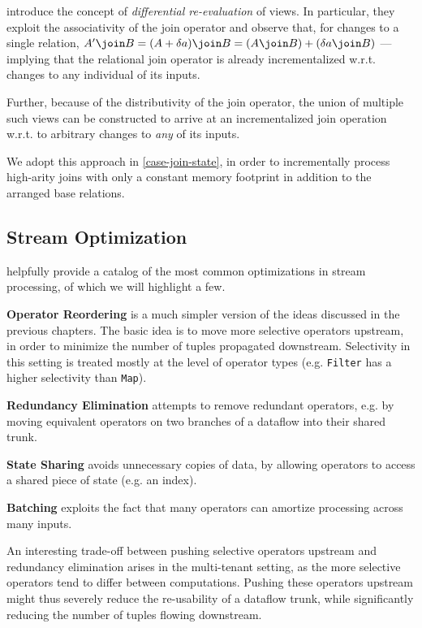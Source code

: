 \documentclass[../index.tex]{subfiles}
\begin{document}
\cite{blakeley1986efficiently} introduce the concept of
\emph{differential re-evaluation} of views. In particular, they
exploit the associativity of the join operator and observe that, for
changes to a single relation, $A' \join B = (A + \delta{a}) \join B =
(A \join B) + (\delta{a} \join B)$ — implying that the relational join
operator is already incrementalized w.r.t. changes to any individual
of its inputs.

Further, because of the distributivity of the join operator, the union
of multiple such views can be constructed to arrive at an
incrementalized join operation w.r.t. to arbitrary changes to
\emph{any} of its inputs.

We adopt this approach in \autoref{case-join-state}, in order to
incrementally process high-arity joins with only a constant memory
footprint in addition to the arranged base relations.

\subsection{Stream Optimization}

\cite{hirzel2014catalog} helpfully provide a catalog of the most
common optimizations in stream processing, of which we will highlight
a few.

\textbf{Operator Reordering} is a much simpler version of the ideas
discussed in the previous chapters. The basic idea is to move more
selective operators upstream, in order to minimize the number of
tuples propagated downstream. Selectivity in this setting is treated
mostly at the level of operator types (e.g. \texttt{Filter} has a
higher selectivity than \texttt{Map}).

\textbf{Redundancy Elimination} attempts to remove redundant operators,
e.g. by moving equivalent operators on two branches of a dataflow into
their shared trunk.

\textbf{State Sharing} avoids unnecessary copies of data, by allowing
operators to access a shared piece of state (e.g. an index).

\textbf{Batching} exploits the fact that many operators can amortize
processing across many inputs.

An interesting trade-off between pushing selective operators upstream
and redundancy elimination arises in the multi-tenant setting, as the
more selective operators tend to differ between computations. Pushing
these operators upstream might thus severely reduce the re-usability
of a dataflow trunk, while significantly reducing the number of tuples
flowing downstream. 
\end{document}
